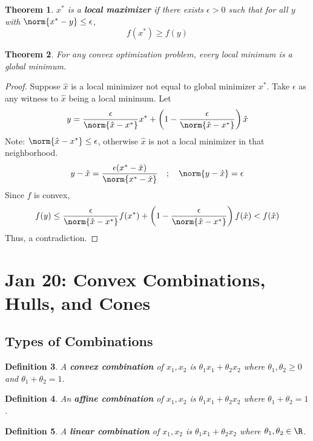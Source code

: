 \documentclass[a4paper]{article}
\newtheorem{thm}{Theorem}[section]
\newtheorem{defn}[thm]{Definition}
\begin{document}
\begin{thm}
    $x^*$ is a \textbf{local maximizer} if there exists $\epsilon > 0$ such that for all $y$ with $\norm{x^* - y} \leq \epsilon$,
    \[
        f(x^*) \geq f(y)
    \]
\end{thm}

\begin{thm}
    For any convex optimization problem, every local minimum is a global minimum.
\end{thm}
\begin{proof}
    Suppose $\hat{x}$ is a local minimizer not equal to global minimizer $x^*$. Take $\epsilon$ as any witness to $\hat{x}$ being a local minimum. Let
    \[
        y = \frac{\epsilon}{\norm{\hat{x} - x^*}} x^* + \left(1 - \frac{\epsilon}{\norm{\hat{x} - x^*}}\right) \hat{x}
    \]
    Note: $\norm{\hat{x} - x^*} \leq \epsilon$, otherwise $\hat{x}$ is not a local minimizer in that neighborhood.
    \[
        y - \hat{x} = \frac{\epsilon (x^* - \hat{x})}{\norm{x^* - \hat{x}}} \quad;\quad \norm{y - \hat{x}} = \epsilon
    \]
    Since $f$ is convex,
    \[
        f(y) \leq \frac{\epsilon}{\norm{\hat{x} - x^*}} f(x^*) + \left(1-\frac{\epsilon}{\norm{\hat{x} - x^*}}\right) f(\hat{x}) < f(\hat{x})
    \]
    Thus, a contradiction.
\end{proof}

\newpage
\section{Jan 20: Convex Combinations, Hulls, and Cones}

\subsection{Types of Combinations}
\begin{defn}
    A \textbf{convex combination} of $x_1, x_2$ is $\theta_1 x_1 + \theta_2 x_2$ where $\theta_1, \theta_2 \geq 0$ and $\theta_1 + \theta_2 = 1$.
\end{defn}

\begin{defn}
    An \textbf{affine combination} of $x_1, x_2$ is $\theta_1 x_1 + \theta_2 x_2$ where $\theta_1 + \theta_2 = 1$.
\end{defn}

\begin{defn}
    A \textbf{linear combination} of $x_1, x_2$ is $\theta_1 x_1 + \theta_2 x_2$ where $\theta_1, \theta_2 \in \R$.
\end{defn}
\end{document}
